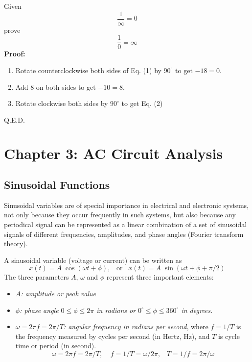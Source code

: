 \documentclass{article}
\begin{document}

Given 
\begin{equation}
  \frac{1}{\infty}=0
\end{equation}
prove
\begin{equation}
  \frac{1}{0}=\infty
\end{equation}
{\bf Proof:}
\begin{enumerate}
\item Rotate counterclockwise both sides of Eq. (1) by $90^\circ$
  to get $-18=0$.
\item Add $8$ on both sides to get $-10=8$.
\item Rotate clockwise both sides by $90^\circ$ to get Eq. (2)
\end{enumerate}
Q.E.D.

\section*{Chapter 3: AC Circuit Analysis}

\subsection*{Sinusoidal Functions}

Sinusoidal variables are of special importance in electrical and 
electronic systems, not only because they occur frequently in such 
systems, but also because any periodical signal can be represented 
as a linear combination of a set of sinusoidal signals of different 
frequencies, amplitudes, and phase angles (Fourier transform theory).

A sinusoidal variable (voltage or current) can be written as
\begin{equation}
  x(t)=A\;\cos(\omega t + \phi),\;\;\;\mbox{or}\;\;\;
  x(t)=A\;\sin(\omega t+\phi+\pi/2) 
\end{equation}
The three parameters $A$, $\omega$ and $\phi$ represent three 
important elements:
\begin{itemize}
\item {\em $A$: amplitude or peak value}
\item {\em $\phi$: phase angle $0 \le \phi \le 2\pi$ in radians or
	$0^\circ \le \phi \le 360^\circ$ in degrees.}
\item {\em $\omega=2\pi f=2\pi/T$: angular frequency in radians per 
  second}, where $f=1/T$ is the frequency measured by cycles per
  second (in Hertz, Hz), and $T$ is cycle time or period (in second).
  \begin{equation}
    \omega=2\pi f=2\pi/T,\;\;\;\;f=1/T=\omega/2\pi,\;\;\;T=1/f=2\pi/\omega 
  \end{equation}
\end{itemize}
\end{document}
